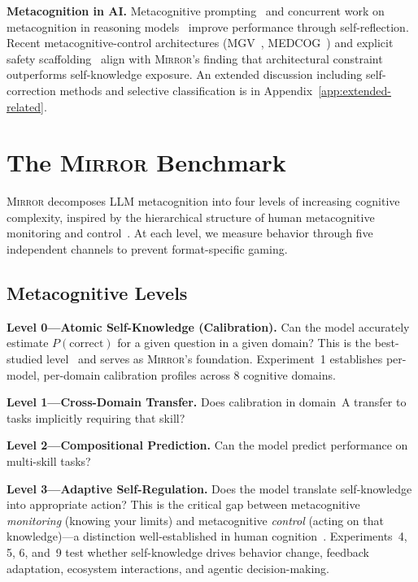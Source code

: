 \documentclass[10pt]{article}
\newcommand{\mirror}{\textsc{Mirror}}
\begin{document}
\textbf{Metacognition in AI.}
Metacognitive prompting~\citep{wang2024metacognitive} and concurrent work on metacognition in reasoning models~\citep{metacog2026} improve performance through self-reflection. Recent metacognitive-control architectures (MGV~\citep{oh2025mgv}, MEDCOG~\citep{zhao2026medcog}) and explicit safety scaffolding~\citep{mosaic2026} align with \mirror{}'s finding that architectural constraint outperforms self-knowledge exposure. An extended discussion including self-correction methods and selective classification is in Appendix~\ref{app:extended-related}.

\section{The \mirror{} Benchmark}
\label{sec:benchmark}

\mirror{} decomposes LLM metacognition into four levels of increasing cognitive
complexity, inspired by the hierarchical structure of human metacognitive monitoring
and control~\citep{flavell1979metacognition, nelson1990metamemory}. At each level,
we measure behavior through five independent channels to prevent format-specific
gaming.

\subsection{Metacognitive Levels}

\textbf{Level 0---Atomic Self-Knowledge (Calibration).}
Can the model accurately estimate $P(\text{correct})$ for a given question in a
given domain? This is the best-studied level~\citep{kadavath2022language,
kapoor2024calibration} and serves as \mirror{}'s foundation. Experiment~1
establishes per-model, per-domain calibration profiles across 8 cognitive domains.

\textbf{Level 1---Cross-Domain Transfer.}
Does calibration in domain~A transfer to tasks implicitly requiring that skill?

\textbf{Level 2---Compositional Prediction.}
Can the model predict performance on multi-skill tasks?

\textbf{Level 3---Adaptive Self-Regulation.}
Does the model translate self-knowledge into appropriate action? This is the
critical gap between metacognitive \textit{monitoring} (knowing your limits) and
metacognitive \textit{control} (acting on that knowledge)---a distinction
well-established in human cognition~\citep{metcalfe2008metacognitive}.
Experiments~4, 5, 6, and~9 test whether self-knowledge drives behavior change,
feedback adaptation, ecosystem interactions, and agentic decision-making.
\end{document}
